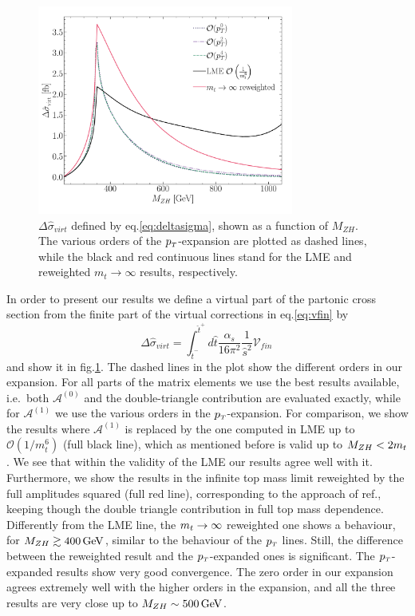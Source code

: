 \begin{figure}[th]
	\centering
	\includegraphics[width=0.75\textwidth]{./figures/sigma_part_virt_LMEreweighted.pdf}
	\caption{$\Delta \hat{\sigma}_{virt}$ defined by eq.\eqref{eq:deltasigma}, shown as a function of $M_{ZH}$. The various orders of the $p_{\scriptscriptstyle T}$-expansion are plotted as dashed lines, while the black and red continuous lines stand for the LME and  reweighted $m_t \rightarrow \infty$ results, respectively.}
	\label{fig:deltasigma}
\end{figure}
In order to present our results we define a virtual part of the partonic cross section
from the finite part of the virtual corrections in eq.\eqref{eq:vfin} by
\begin{equation}
	\Delta \hat{\sigma}_{virt}=
	\int_{\hat{t}^-}^{\hat{t}^+} d\hat{t}
	\frac{\alpha_s}{16\pi^2}\frac{1}{\hat{s}^2}\mathcal{V}_{fin}\,
	\label{eq:deltasigma}
\end{equation}
and  show it in fig.\ref{fig:deltasigma}. The dashed lines in the
plot show the different orders in our expansion. 
For all parts of the matrix elements we use the best results
available, i.e.~both $\mathcal{A}^{(0)}$ and the double-triangle
contribution are evaluated  exactly, while for
$\mathcal{A}^{(1)}$ we use the various orders in the $p_{\scriptscriptstyle T}$-expansion.
For comparison, we show the results where
$\mathcal{A}^{(1)}$ is replaced by the one computed in LME up to
$\mathcal{O}(1/m_t^6)$ (full black line), which as mentioned before is valid
up to $M_{ZH}< 2 m_t$. We see that within the validity of the LME our
results agree well with it.
Furthermore, we show the results in the infinite top
mass limit reweighted by the full amplitudes squared (full red line), corresponding to the
approach of ref.\cite{Altenkamp:2012sx}, keeping though the double triangle
contribution in full top mass dependence. 
Differently from the LME line, the $m_t \to \infty$ reweighted one
shows a behaviour, for  $M_{ZH} \gtrsim 400\,\textrm{GeV}$, similar to the behaviour of
the $p_{\scriptscriptstyle T}$ lines. Still,   the difference
between the reweighted result and the $p_{\scriptscriptstyle T}$-expanded ones is  significant.
The $p_{\scriptscriptstyle T}$-expanded results show
very good convergence.  The zero order in our expansion agrees
extremely well with the higher orders in the expansion, and all the
three results are very close up to $M_{ZH} \sim 500\,\textrm{GeV}$.


